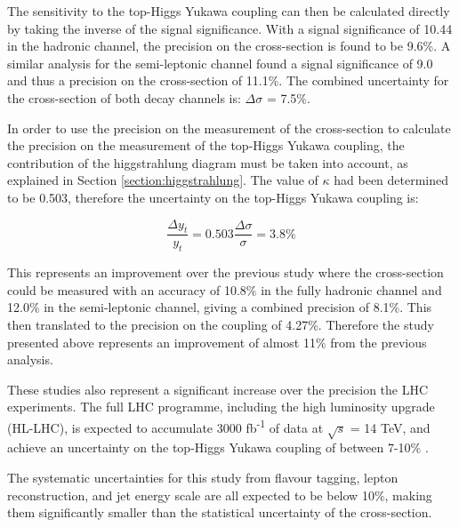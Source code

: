 The sensitivity to the top-Higgs Yukawa coupling can then be calculated directly by taking the inverse of the signal significance. With a signal significance of 10.44 in the hadronic channel, the precision on the cross-section is found to be 9.6\%. A similar analysis for the semi-leptonic channel found a signal significance of 9.0 and thus a precision on the cross-section of 11.1\%. The combined uncertainty for the cross-section of both decay channels is: $\Delta\sigma$ = 7.5\%.

In order to use the precision on the measurement of the cross-section to calculate the precision on the measurement of the top-Higgs Yukawa coupling, the contribution of the higgstrahlung diagram must be taken into account, as explained in Section \ref{section:higgstrahlung}. The value of $\kappa$ had been determined to be 0.503, therefore the uncertainty on the top-Higgs Yukawa coupling is:

\begin{equation}
	\frac{\Delta y_t}{y_t} = 0.503 \frac{\Delta\sigma}{\sigma} = 3.8\%
\label{eq:result-coupling}
\end{equation}

This represents an improvement over the previous study \cite{clic-yukawa-coupling-2014} where the cross-section could be measured with an accuracy of 10.8\% in the fully hadronic channel and 12.0\% in the semi-leptonic channel, giving a combined precision of 8.1\%. This then translated to the precision on the coupling of 4.27\%. Therefore the study presented above represents an improvement of almost 11\% from the previous analysis.

These studies also represent a significant increase over the precision the \acrshort{LHC} experiments. The full \acrshort{LHC} programme, including the high luminosity upgrade (\acrshort{HL-LHC}), is expected to accumulate 3000 fb\textsuperscript{-1} of data at $\sqrt{s}$ = 14 TeV, and achieve an uncertainty on the top-Higgs Yukawa coupling of between 7-10\% \cite{lhc-top-yukawa}.

The systematic uncertainties for this study from flavour tagging, lepton reconstruction, and jet energy scale are all expected to be below 10\%, making them significantly smaller than the statistical uncertainty of the cross-section.  \\


